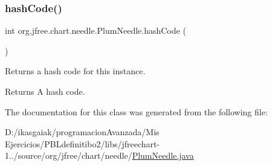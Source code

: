 \subsubsection{\texorpdfstring{hash\+Code()}{hashCode()}}
{\footnotesize\ttfamily int org.\+jfree.\+chart.\+needle.\+Plum\+Needle.\+hash\+Code (\begin{DoxyParamCaption}{ }\end{DoxyParamCaption})}

Returns a hash code for this instance.

\begin{DoxyReturn}{Returns}
A hash code. 
\end{DoxyReturn}


The documentation for this class was generated from the following file\+:\begin{DoxyCompactItemize}
\item 
D\+:/ikasgaiak/programacion\+Avanzada/\+Mis Ejercicios/\+P\+B\+Ldefinitibo2/libs/jfreechart-\/1../source/org/jfree/chart/needle/\mbox{\hyperlink{_plum_needle_8java}{Plum\+Needle.\+java}}\end{DoxyCompactItemize}
